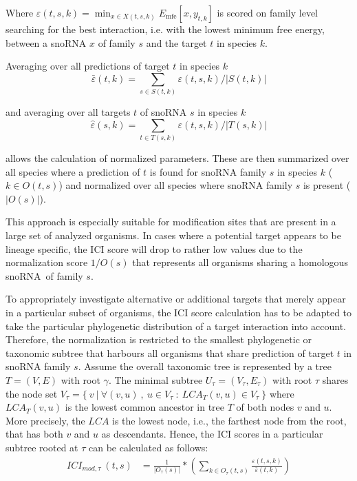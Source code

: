 \documentclass[preprint,3p,times,twocolumn]{elsarticle}
\newcommand{\sno}{snoRNA}
\begin{document}
Where
$ \varepsilon(t,s,k) = \min_{x\in X(t,s,k)} E_{\textrm{mfe}}[x,y_{t,k}] $
is scored on family level searching for the best interaction,
i.e. with the lowest minimum free energy, between a snoRNA $x$ of
family $s$ and the target $t$ in species $k$.

Averaging over all predictions of target $t$ in
species $k$
\begin{equation}
\bar\varepsilon(t,k)=\sum_{s\in
  S(t,k)}\varepsilon(t,s,k)/|S(t,k)|
\end{equation}

and averaging over all targets $t$ of snoRNA $s$ in species $k$
\begin{equation}
\hat\varepsilon(s,k)=\sum_{t\in
  T(s,k)}\varepsilon(t,s,k)/|T(s,k)|
\end{equation}

allows the calculation of normalized parameters. These are then
summarized over all species where a prediction of $t$ is found for
snoRNA family $s$ in species $k$ ($k\in O(t,s) $) and normalized over
all species where snoRNA family $s$ is present ($|O(s)|$).


This approach is especially suitable for modification sites that are
present in a large set of analyzed organisms. In cases where a
potential target appears to be lineage specific, the ICI score will
drop to rather low values due to the normalization score $1/O(s)$ that
represents all organisms sharing a homologous \sno\ of family $s$.

To appropriately investigate alternative or additional targets that
merely appear in a particular subset of organisms, the ICI score
calculation has to be adapted to take the particular phylogenetic
distribution of a target interaction into account. Therefore, the
normalization is restricted to the smallest phylogenetic or taxonomic
subtree that harbours all organisms that share prediction of target
$t$ in snoRNA family $s$.  Assume the overall taxonomic tree is
represented by a tree $T=(V,E)$ with root $\gamma$. The minimal
subtree $U_\tau = (V_\tau, E_\tau)$ with root $\tau$ shares the node
set
$V_\tau = \{\ v\ |\ \forall (v,u)\ ,\ u \in V_\tau\ :\ LCA_T(v,u) \in
V_\tau\ \}$ where $LCA_T(v,u)$ is the lowest common ancestor in tree
$T$ of both nodes $v$ and $u$. More precisely, the $LCA$ is the lowest
node, i.e., the farthest node from the root, that has both $v$ and $u$
as descendants.  Hence, the ICI scores in a particular subtree rooted
at $\tau$ can be calculated as follows:
\begin{equation}
  \begin{split}
    ICI_{mod,\tau}\:(t,s) & = \frac{1}{|O_\tau(s)|} * \left( \sum_{k\in O_\tau(t,s)} \frac{\varepsilon(t,s,k)}{\bar\varepsilon(t,k)} \right)
  \end{split}
\end{equation}
\end{document}
